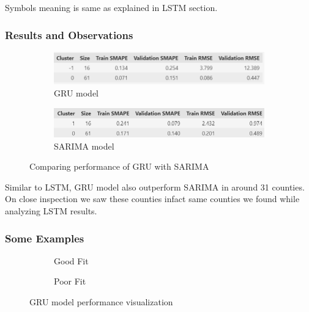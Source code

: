 \documentclass{article}
\begin{document}
Symbols meaning is same as explained in LSTM section. 

\vspace{1em}
\subsubsection{Results and Observations}


\begin{figure}[h]
	\centering
	\vspace{1em}
	\begin{subfigure}{0.6\textwidth}
		\includegraphics[width=\linewidth]{images/gru_results}
		\caption{GRU model}
		\label{fig:gru}
	\end{subfigure}
	
	\begin{subfigure}{0.6\textwidth}
		\centering
		\includegraphics[width=\linewidth]{images/benchmark_lstm_with_sarima}
		\caption{SARIMA model}
		\label{fig:gru_vs_sarima}
	\end{subfigure}
	\caption{Comparing performance of GRU with SARIMA}
	\label{fig:gru_sarima_both}
\end{figure}

Similar to LSTM, GRU model also outperform SARIMA in around 31 counties. On close inspection we saw these counties infact same counties we found while analyzing LSTM  results. 

\newpage
\subsubsection{Some Examples}

\begin{figure}[h]
	\centering
	\vspace{1em}
	\begin{subfigure}{0.45\textwidth}
		\caption{Good Fit}
		\label{fig:lstm_good}
	\end{subfigure}
	\begin{subfigure}{0.45\textwidth}
		\caption{Poor Fit}
		\label{fig:lstm_poor}
	\end{subfigure}
	\caption{GRU model performance visualization}
	\label{fig:lstm_both}
\end{figure}
\end{document}
